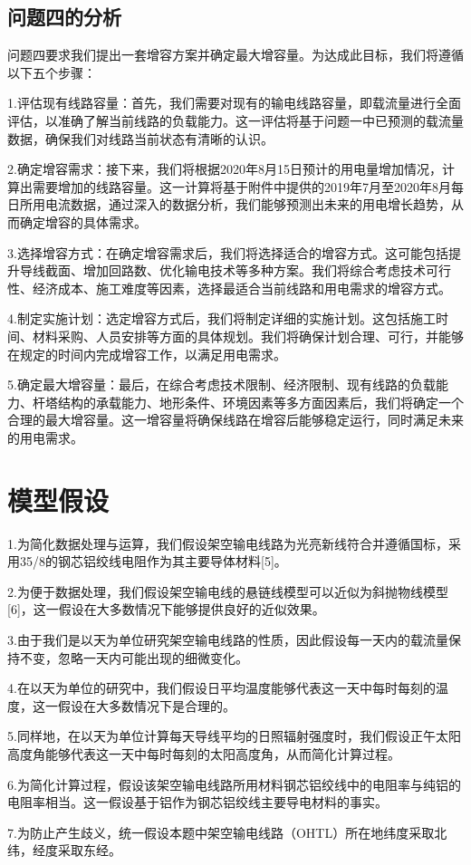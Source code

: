 \documentclass[a4paper,12.045pt]{ctexart}
\begin{document}
	\subsection{问题四的分析}
	问题四要求我们提出一套增容方案并确定最大增容量。为达成此目标，我们将遵循以下五个步骤：
	\par
	1.评估现有线路容量：首先，我们需要对现有的输电线路容量，即载流量进行全面评估，以准确了解当前线路的负载能力。这一评估将基于问题一中已预测的载流量数据，确保我们对线路当前状态有清晰的认识。
	\par
	2.确定增容需求：接下来，我们将根据2020年8月15日预计的用电量增加情况，计算出需要增加的线路容量。这一计算将基于附件中提供的2019年7月至2020年8月每日所用电流数据，通过深入的数据分析，我们能够预测出未来的用电增长趋势，从而确定增容的具体需求。
	\par
	3.选择增容方式：在确定增容需求后，我们将选择适合的增容方式。这可能包括提升导线截面、增加回路数、优化输电技术等多种方案。我们将综合考虑技术可行性、经济成本、施工难度等因素，选择最适合当前线路和用电需求的增容方式。
	\par
	4.制定实施计划：选定增容方式后，我们将制定详细的实施计划。这包括施工时间、材料采购、人员安排等方面的具体规划。我们将确保计划合理、可行，并能够在规定的时间内完成增容工作，以满足用电需求。
	\par
	5.确定最大增容量：最后，在综合考虑技术限制、经济限制、现有线路的负载能力、杆塔结构的承载能力、地形条件、环境因素等多方面因素后，我们将确定一个合理的最大增容量。这一增容量将确保线路在增容后能够稳定运行，同时满足未来的用电需求。
	
	
	\section{模型假设} 
	1.为简化数据处理与运算，我们假设架空输电线路为光亮新线符合并遵循国标，采用35/8的钢芯铝绞线电阻作为其主要导体材料[5]。
	\par   
	2.为便于数据处理，我们假设架空输电线的悬链线模型可以近似为斜抛物线模型[6]，这一假设在大多数情况下能够提供良好的近似效果。
	\par   
	3.由于我们是以天为单位研究架空输电线路的性质，因此假设每一天内的载流量保持不变，忽略一天内可能出现的细微变化。
	\par
	4.在以天为单位的研究中，我们假设日平均温度能够代表这一天中每时每刻的温度，这一假设在大多数情况下是合理的。
	\par
	5.同样地，在以天为单位计算每天导线平均的日照辐射强度时，我们假设正午太阳高度角能够代表这一天中每时每刻的太阳高度角，从而简化计算过程。
	\par
	6.为简化计算过程，假设该架空输电线路所用材料钢芯铝绞线中的电阻率与纯铝的电阻率相当。这一假设基于铝作为钢芯铝绞线主要导电材料的事实。
	\par
	7.为防止产生歧义，统一假设本题中架空输电线路（OHTL）所在地纬度采取北纬，经度采取东经。
\end{document}
